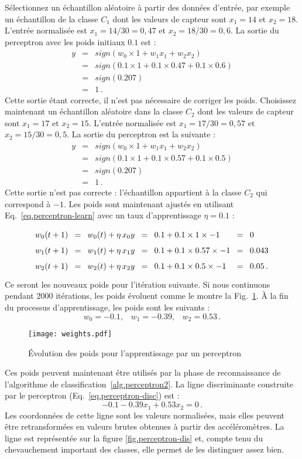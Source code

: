 Sélectionnez un échantillon aléatoire à partir des données d'entrée, par exemple un échantillon de la classe $C_1$ dont les valeurs de capteur sont $x_{1}=14$ et $x_{2}=18$. L'entrée normalisée est $x_{1}=14/30=0,47$ et $x_{2}=18/30=0,6$. La sortie du perceptron avec les poids initiaux $0.1$ est :
\begin{eqnarray*}
y &=& \mathit{sign}(w_0\times 1 + w_1x_1 + w_2x_2)\\
&=& \mathit{sign}(0.1\times 1 + 0.1\times 0.47 + 0.1\times 0.6)\\
&=& \mathit{sign}(0.207)\\
&=& 1\,.
\end{eqnarray*}
Cette sortie étant correcte, il n'est pas nécessaire de corriger les poids. Choisissez maintenant un échantillon aléatoire dans la classe $C_2$ dont les valeurs de capteur sont $x_{1}=17$ et $x_{2}=15$. L'entrée normalisée est $x_{1}=17/30=0,57$ et $x_{2}=15/30=0,5$. La sortie du perceptron est la suivante :
\begin{eqnarray*}
y &=& \mathit{sign}(w_0\times 1 + w_1x_1 + w_2x_2)\\
&=& \mathit{sign}(0.1\times 1 + 0.1\times 0.57 + 0.1\times 0.5)\\
&=& \mathit{sign}(0.207)\\
&=& 1\,.
\end{eqnarray*}
Cette sortie n'est pas correcte : l'échantillon appartient à la classe $C_2$ qui correspond à $-1$. Les poids sont maintenant ajustés en utilisant Eq.~\ref{eq.perceptron-learn} avec un taux d'apprentissage $\eta = 0.1$ :
\[
\spacearray
\begin{array}{lclclcl}
w_0(t+1) &=& w_0(t) + \eta \,x_0 y &=& 0.1 + 0.1\times 1\times -1 &=& 0 \\
w_1(t+1) &=& w_1(t) + \eta \,x_1 y &=& 0.1 + 0.1\times 0.57\times-1 &=& 0.043 \\
w_2(t+1) &=& w_2(t) + \eta \,x_2 y &=& 0.1 + 0.1\times 0.5\times -1 &=& 0.05\,.
\end{array}
\]
Ce seront les nouveaux poids pour l'itération suivante. Si nous continuons pendant $2000$ itérations, les poids évoluent comme le montre la Fig.~\ref{fig.weights-fixeta}. À la fin du processus d'apprentissage, les poids sont les suivants :
\[
w_0 = -0.1,\;\;\; w_1 = -0.39,\;\;\; w_2 = 0.53\,.
\]

\begin{figure}[bt]
\begin{center}
\texttt{[image: weights.pdf]}
\end{center}
\caption{Évolution des poids pour l'apprentissage par un perceptron}\label{fig.weights-fixeta}
\end{figure}
Ces poids peuvent maintenant être utilisés par la phase de reconnaissance de l'algorithme de classification~\ref{alg.perceptron2}. La ligne discriminante construite par le perceptron (Eq.~\ref{eq.perceptron-disc}) est :
\[
-0.1 -0.39x_1 + 0.53x_2 = 0\,.
\]
Les coordonnées de cette ligne sont les valeurs normalisées, mais elles peuvent être retransformées en valeurs brutes obtenues à partir des accéléromètres. La ligne est représentée sur la figure \ref{fig.perceptron-dis} et, compte tenu du chevauchement important des classes, elle permet de les distinguer assez bien.

